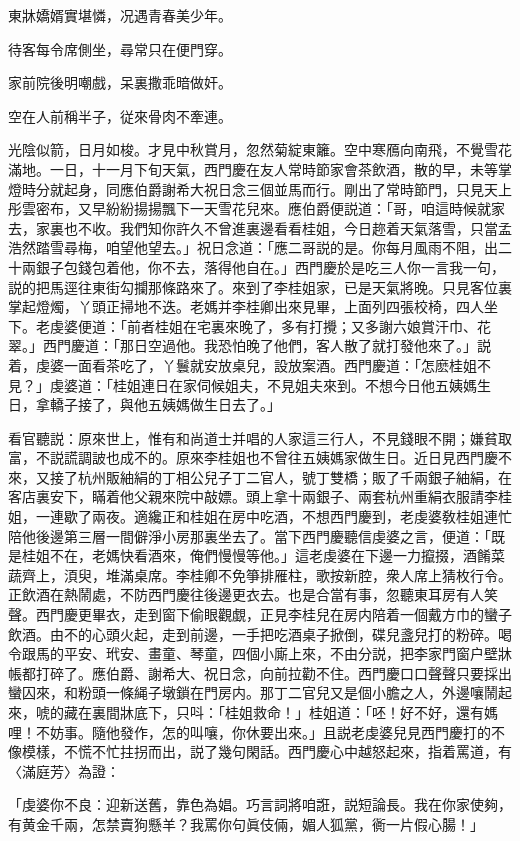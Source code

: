 東牀嬌婿實堪憐，况遇青春美少年。

待客每令席側坐，尋常只在便門穿。

家前院後明嘲戲，呆裏撒乖暗做奸。

空在人前稱半子，従來骨肉不牽連。

光陰似箭，日月如梭。才見中秋賞月，忽然菊綻東籬。空中寒鴈向南飛，不覺雪花滿地。一日，十一月下旬天氣，西門慶在友人常時節家會茶飲酒，散的早，未等掌燈時分就起身，同應伯爵謝希大祝日念三個並馬而行。剛出了常時節門，只見天上彤雲密布，又早紛紛揚揚飄下一天雪花兒來。應伯爵便説道：「哥，咱這時候就家去，家裏也不收。我們知你許久不曾進裏邊看看桂姐，今日趂着天氣落雪，只當孟浩然踏雪尋梅，咱望他望去。」祝日念道：「應二哥説的是。你每月風雨不阻，出二十兩銀子包錢包着他，你不去，落得他自在。」西門慶於是吃三人你一言我一句，説的把馬逕往東街勾攔那條路來了。來到了李桂姐家，已是天氣將晚。只見客位裏掌起燈燭，丫頭正掃地不迭。老媽并李桂卿出來見畢，上面列四張校椅，四人坐下。老虔婆便道：「前者桂姐在宅裏來晚了，多有打攪；又多謝六娘賞汗巾、花翠。」西門慶道：「那日空過他。我恐怕晚了他們，客人散了就打發他來了。」説着，虔婆一面看茶吃了，丫鬟就安放桌兒，設放案酒。西門慶道：「怎麽桂姐不見？」虔婆道：「桂姐連日在家伺候姐夫，不見姐夫來到。不想今日他五姨媽生日，拿轎子接了，與他五姨媽做生日去了。」

看官聽説：原來世上，惟有和尚道士并唱的人家這三行人，不見錢眼不開；嫌貧取富，不説謊調詖也成不的。原來李桂姐也不曾往五姨媽家做生日。近日見西門慶不來，又接了杭州販紬絹的丁相公兒子丁二官人，號丁雙橋；販了千兩銀子紬絹，在客店裏安下，瞞着他父親來院中敲嫖。頭上拿十兩銀子、兩套杭州重絹衣服請李桂姐，一連歇了兩夜。適纔正和桂姐在房中吃酒，不想西門慶到，老虔婆敎桂姐連忙陪他後邊第三層一間僻淨小房那裏坐去了。當下西門慶聽信虔婆之言，便道：「既是桂姐不在，老媽快看酒來，俺們慢慢等他。」這老虔婆在下邊一力攛掇，酒餚菜蔬齊上，湏臾，堆滿桌席。李桂卿不免箏排雁柱，歌按新腔，衆人席上猜枚行令。正飲酒在熱鬧處，不防西門慶往後邊更衣去。也是合當有事，忽聽東耳房有人笑聲。西門慶更畢衣，走到窗下偷眼觀覷，正見李桂兒在房内陪着一個戴方巾的蠻子飲酒。由不的心頭火起，走到前邊，一手把吃酒桌子掀倒，碟兒盞兒打的粉碎。喝令跟馬的平安、玳安、畫童、琴童，四個小廝上來，不由分説，把李家門窗户壁牀帳都打碎了。應伯爵、謝希大、祝日念，向前拉勸不住。西門慶口口聲聲只要採出蠻囚來，和粉頭一條䋲子墩鎖在門房内。那丁二官兒又是個小膽之人，外邊嚷鬧起來，唬的藏在裏間牀底下，只呌：「桂姐救命！」桂姐道：「呸！好不好，還有媽哩！不妨事。隨他發作，怎的叫嚷，你休要出來。」且説老虔婆兒見西門慶打的不像模樣，不慌不忙拄拐而出，説了幾句閑話。西門慶心中越怒起來，指着罵道，有〈滿庭芳〉為證：

「虔婆你不良：迎新送舊，靠色為娼。巧言詞將咱誑，説短論長。我在你家使夠，有黄金千兩，怎禁賣狗懸羊？我罵你句眞伎倆，媚人狐黨，衠一片假心腸！」

